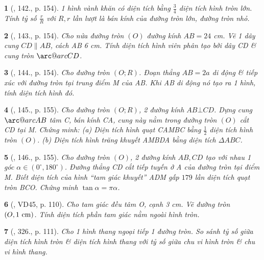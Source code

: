 \documentclass{article}
\makeatletter
\newcommand{\arc@char}{{\usefont{U}{tipa}{m}{n}\symbol{62}}}%
\newcommand{\arc}[1]{\mathpalette\arc@arc{#1}}
\newcommand{\arc@arc}[2]{%
	\sbox0{$\m@th#1#2$}%
	\vbox{
		\hbox{\resizebox{\wd0}{\height}{\arc@char}}
		\nointerlineskip
		\box0
	}%
}
\newtheorem{baitoan}{}
\makeatother
\begin{document}
\begin{baitoan}[\cite{Tuyen_Toan_9_old}, 142., p. 154]
	1 hình vành khăn có diện tích bằng $\frac{3}{4}$ diện tích hình tròn lớn. Tính tỷ số $\frac{r}{R}$ với $R,r$ lần lượt là bán kính của đường tròn lớn, đường tròn nhỏ.
\end{baitoan}

\begin{baitoan}[\cite{Tuyen_Toan_9_old}, 143., p. 154]
	Cho nửa đường tròn $(O)$ đường kính $AB = 24$ {\rm cm}. Vẽ 1 dây cung $CD\parallel AB$, cách AB {\rm6 cm}. Tính diện tích hình viên phân tạo bởi dây CD \& cung tròn $\arc{CD}$.
\end{baitoan}

\begin{baitoan}[\cite{Tuyen_Toan_9_old}, 144., p. 154]
	Cho đường tròn $(O;R)$. Đoạn thẳng $AB = 2a$ di động \& tiếp xúc với đường tròn tại trung điểm M của AB. Khi AB di động nó tạo ra 1 hình, tính diện tích hình đó.
\end{baitoan}

\begin{baitoan}[\cite{Tuyen_Toan_9_old}, 145., p. 155]
	Cho đường tròn $(O;R)$, 2 đường kính $AB\bot CD$. Dựng cung $\arc{AB}$ tâm C, bán kính CA, cung này nằm trong đường tròn $(O)$ cắt CD tại M. Chứng minh: (a) Diện tích hình quạt CAMBC bằng $\frac{1}{2}$ diện tích hình tròn $(O)$. (b) Diện tích hình trăng khuyết AMBDA bằng diện tích $\Delta ABC$.
\end{baitoan}

\begin{baitoan}[\cite{Tuyen_Toan_9_old}, 146., p. 155]
	Cho đường tròn $(O)$, 2 đường kính $AB,CD$ tạo với nhau 1 góc $\alpha\in(0^\circ,180^\circ)$. Đường thẳng CD cắt tiếp tuyến ở A của đường tròn tại điểm M. Biết diện tích của hình ``tam giác khuyết'' ADM gấp $179$ lần diện tích quạt tròn BCO. Chứng minh $\tan\alpha = \pi\alpha$.
\end{baitoan}

\begin{baitoan}[\cite{Binh_Toan_9_tap_2}, VD45, p. 110]
	Cho tam giác đều tâm O, cạnh {\rm3 cm}. Vẽ đường tròn $(O,1\ {\rm cm})$. Tính diện tích phần tam giác nằm ngoài hình tròn.
\end{baitoan}

\begin{baitoan}[\cite{Binh_Toan_9_tap_2}, 326., p. 111]
	Cho 1 hình thang ngoại tiếp 1 đường tròn. So sánh tỷ số giữa diện tích hình tròn \& diện tích hình thang với tỷ số giữa chu vi hình tròn \& chu vi hình thang.
\end{baitoan}
\end{document}
